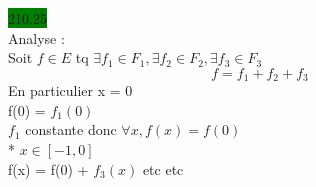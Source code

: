 \documentclass{article}
\begin{document}
\noindent \colorbox{green}{210.25}\\
Analyse : \\
Soit \(f \in E\) tq \(\exists f_1 \in F_1, \exists f_2 \in F_2, \exists f_3 \in F_3\)\begin{equation*}
    f = f_1 + f_2 + f_3
\end{equation*}
En particulier x = 0 \\
f(0) = \(f_1(0)\)\\
\(f_1\) constante donc \(\forall x, f(x) = f(0)\)\\
* \(x \in [-1, 0]\)\\
f(x) = f(0) + \(f_3(x)\)
etc etc 
\end{document}
